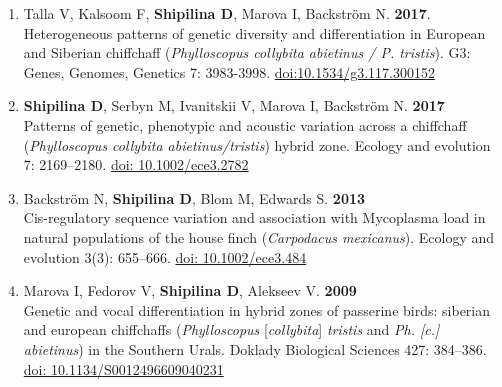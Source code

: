\documentclass[10pt]{article}
\begin{document}
\begin{cv}
            \begin{enumerate}%
			\item Talla V, Kalsoom F, \textbf{Shipilina D}, Marova I, Backström N. \textbf{2017}. 
	Heterogeneous patterns of genetic diversity and differentiation in European and Siberian chiffchaff (\textit{Phylloscopus collybita abietinus / P. tristis}). G3: Genes, Genomes, Genetics 7: 3983-3998. \href{http://dx.doi.org/doi:10.1534/g3.117.300152}{doi:10.1534/g3.117.300152}
	 \item  \textbf{Shipilina D}, Serbyn M, Ivanitskii V, Marova I, Backström N. \textbf{2017}\\
	        Patterns of genetic, phenotypic and acoustic variation across a chiffchaff (\textit{Phylloscopus collybita abietinus/tristis}) hybrid zone. Ecology and evolution 7: 2169--2180. \href{http://dx.doi.org/doi: 10.1002/ece3.2782}{doi: 10.1002/ece3.2782}
\item  Backstr{\"o}m N, \textbf{Shipilina D}, Blom M, Edwards S. \textbf{2013}\\
	           Cis-regulatory sequence variation and association with Mycoplasma load in natural populations of the house finch (\textit{Carpodacus mexicanus}). Ecology and evolution 3(3): 655--666. \href{http://dx.doi.org/doi.org/10.1002/ece3.484}{doi: 10.1002/ece3.484 }
\item  Marova I, Fedorov V, \textbf{Shipilina D}, Alekseev V. \textbf{2009}\\
Genetic and vocal differentiation in hybrid zones of passerine birds: siberian and european chiffchaffs (\textit{Phylloscopus} [\textit{collybita}] \textit{tristis} and \textit{Ph. [c.] abietinus}) in the Southern Urals. Doklady Biological Sciences 427: 384--386. \href{http://dx.doi.org/doi.org/10.1134/S0012496609040231}{doi: 10.1134/S0012496609040231}          

\end{enumerate}
\end{cv}
\end{document}
